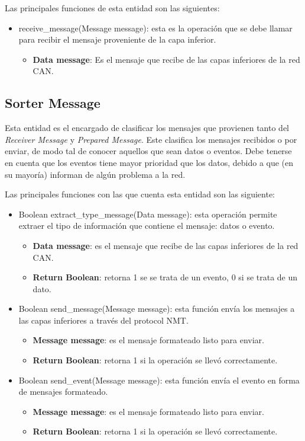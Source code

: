 Las principales funciones de esta entidad son las siguientes:
\begin{itemize}
\item receive\_message(Message message): esta es la operación que se debe llamar
  para recibir el mensaje proveniente de la capa inferior. 
  \begin{itemize}
  \item \textbf{Data message}: Es el mensaje que recibe de las capas inferiores
    de la red CAN.
  \end{itemize}
\end{itemize}

\subsection{Sorter Message}
Esta entidad es el encargado de clasificar los mensajes que provienen tanto del
\textit{Receiver Message} y \textit{Prepared Message}. Este clasifica los
mensajes recibidos o por enviar, de modo tal de conocer aquellos que sean
datos o eventos. Debe tenerse en cuenta que los eventos tiene mayor prioridad
que los datos, debido a que (en su mayoría) informan de algún problema a la red.

Las principales funciones con las que cuenta esta entidad son las siguiente:
\begin{itemize}
  \item Boolean extract\_type\_message(Data message): esta operación permite
  extraer el tipo de información que contiene el mensaje: datos o evento.
  \begin{itemize}
  \item \textbf{Data message}: es el mensaje que recibe de las capas inferiores
    de la red CAN.
  \item \textbf{Return Boolean}: retorna 1 se se trata de un evento, 0 si se
    trata de un dato.
  \end{itemize}

\item Boolean send\_message(Message message): esta función envía los mensajes
  a las capas inferiores a través del protocol NMT.
  \begin{itemize}
  \item \textbf{Message message}: es el mensaje formateado listo para enviar.
  \item \textbf{Return Boolean}: retorna 1 si la operación se llevó
    correctamente.
  \end{itemize}
\item Boolean send\_event(Message message): esta función envía el evento en
  forma de mensajes formateado. 
    \begin{itemize}
  \item \textbf{Message message}: es el mensaje formateado listo para enviar.
  \item \textbf{Return Boolean}: retorna 1 si la operación se llevó
    correctamente.
  \end{itemize}
\end{itemize}


